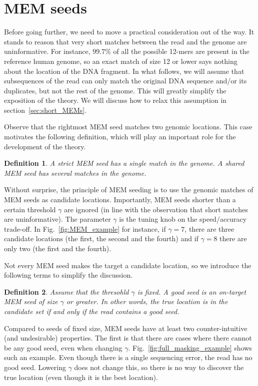 \documentclass{article}
\newtheorem{definition}{Definition}
\begin{document}
\section{MEM seeds}

Before going further, we need to move a practical consideration out of the
way. It stands to reason that very short matches between the read and the
genome are uninformative. For instance, $99.7\%$ of all the possible
12-mers are present in the reference human genome, so an exact match of
size 12 or lower says nothing about the location of the DNA fragment. In
what follows, we will assume that subsequences of the read can only match
the original DNA sequence and/or its duplicates, but not the rest of the
genome. This will greatly simplify the exposition of the theory. We will
discuss how to relax this assumption in section~\ref{sec:short_MEMs}.

Observe that the rightmost MEM seed matches two genomic locations. This
case motivates the following definition, which will play an important role
for the development of the theory.

\begin{definition}
A \emph{strict} MEM seed has a single match in the genome.
A \emph{shared} MEM seed has several matches in the genome.
\end{definition}

Without surprise, the principle of MEM seeding is to use the genomic
matches of MEM seeds as candidate locations. Importantly, MEM seeds
shorter than a certain threshold $\gamma$ are ignored (in line with the
observation that short matches are uninformative). The parameter $\gamma$
is the tuning knob on the speed/accuracy trade-off. In
Fig.~\ref{fig:MEM_example} for instance, if $\gamma = 7$, there are three
candidate locations (the first, the second and the fourth) and if $\gamma
= 8$ there are only two (the first and the fourth).

Not every MEM seed makes the target a candidate location, so we introduce
the following terms to simplify the discussion.

\begin{definition}
Assume that the thresohld $\gamma$ is fixed. A \emph{good} seed is an
on-target MEM seed of size $\gamma$ or greater. In other words, the true
location is in the candidate set if and only if the read contains a
good seed.
\end{definition}

Compared to seeds of fixed size, MEM seeds have at least two
counter-intuitive (and undesirable) properties. The first is that there
are cases where there cannot be any good seed, even when changing
$\gamma$. Fig.~\ref{fig:full_masking_example} shows such an example. Even
though there is a single sequencing error, the read has no good seed.
Lowering $\gamma$ does not change this, so there is no way to discover the
true location (even though it is the best location).
\end{document}
